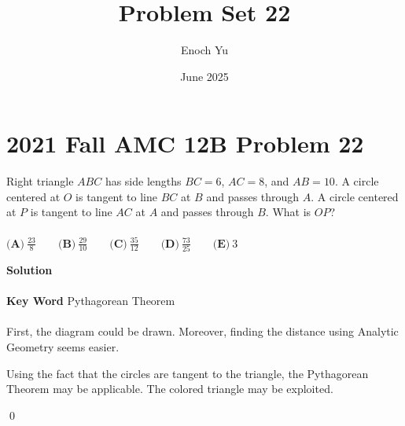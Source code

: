 \documentclass{article}
\title{Problem Set 22}
\author{Enoch Yu}
\date{June 2025}
\newenvironment{solution}{\begin{trivlist}\item[]{\bf Solution}}{\qed \end{trivlist}}
\begin{document}
\section*{2021 Fall AMC 12B Problem 22}
Right triangle $ABC$ has side lengths $BC=6$, $AC=8$, and $AB=10$. A circle centered at $O$ is tangent to line $BC$ at $B$ and passes through $A$. A circle centered at $P$ is tangent to line $AC$ at $A$ and passes through $B$. What is $OP$?
\\\\
$\textbf{(A)}\ \frac{23}{8} \qquad\textbf{(B)}\  \frac{29}{10} \qquad\textbf{(C)}\  \frac{35}{12} \qquad\textbf{(D)}\ \frac{73}{25} \qquad\textbf{(E)}\ 3$
\begin{solution}
\\\\
\textbf{Key Word} Pythagorean Theorem
\\\\
First, the diagram could be drawn. Moreover, finding the distance using Analytic Geometry seems easier.
\begin{center}
\end{center}
Using the fact that the circles are tangent to the triangle, the Pythagorean Theorem may be applicable.
The colored triangle may be exploited.
\begin{center}
\end{center}
\end{solution}
\end{document}
